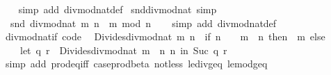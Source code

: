 \begin{isabellebody}
%
\isadelimproof
\ \ %
\endisadelimproof
%
\isatagproof
{}\isamarkupfalse%
\ {\isacharparenleft}{\kern0pt}simp\ add{\isacharcolon}{\kern0pt}\ divmod{\isacharunderscore}{\kern0pt}nat{\isacharunderscore}{\kern0pt}def{\isacharparenright}{\kern0pt}%
\endisatagproof
{\isafoldproof}%
%
\isadelimproof
\isanewline
%
\endisadelimproof
\isanewline
{}\isamarkupfalse%
\ snd{\isacharunderscore}{\kern0pt}divmod{\isacharunderscore}{\kern0pt}nat\ {\isacharbrackleft}{\kern0pt}simp{\isacharbrackright}{\kern0pt}{\isacharcolon}{\kern0pt}\isanewline
\ \ {\isachardoublequoteopen}snd\ {\isacharparenleft}{\kern0pt}divmod{\isacharunderscore}{\kern0pt}nat\ m\ n{\isacharparenright}{\kern0pt}\ {\isacharequal}{\kern0pt}\ m\ mod\ n{\isachardoublequoteclose}\isanewline
%
\isadelimproof
\ \ %
\endisadelimproof
%
\isatagproof
{}\isamarkupfalse%
\ {\isacharparenleft}{\kern0pt}simp\ add{\isacharcolon}{\kern0pt}\ divmod{\isacharunderscore}{\kern0pt}nat{\isacharunderscore}{\kern0pt}def{\isacharparenright}{\kern0pt}%
\endisatagproof
{\isafoldproof}%
%
\isadelimproof
\isanewline
%
\endisadelimproof
\isanewline
{}\isamarkupfalse%
\ divmod{\isacharunderscore}{\kern0pt}nat{\isacharunderscore}{\kern0pt}if\ {\isacharbrackleft}{\kern0pt}code{\isacharbrackright}{\kern0pt}{\isacharcolon}{\kern0pt}\isanewline
\ \ {\isachardoublequoteopen}Divides{\isachardot}{\kern0pt}divmod{\isacharunderscore}{\kern0pt}nat\ m\ n\ {\isacharequal}{\kern0pt}\ {\isacharparenleft}{\kern0pt}if\ n\ {\isacharequal}{\kern0pt}\ {}\ {\isasymor}\ m\ {\isacharless}{\kern0pt}\ n\ then\ {\isacharparenleft}{\kern0pt}{}{\isacharcomma}{\kern0pt}\ m{\isacharparenright}{\kern0pt}\ else\isanewline
\ \ \ \ let\ {\isacharparenleft}{\kern0pt}q{\isacharcomma}{\kern0pt}\ r{\isacharparenright}{\kern0pt}\ {\isacharequal}{\kern0pt}\ Divides{\isachardot}{\kern0pt}divmod{\isacharunderscore}{\kern0pt}nat\ {\isacharparenleft}{\kern0pt}m\ {\isacharminus}{\kern0pt}\ n{\isacharparenright}{\kern0pt}\ n\ in\ {\isacharparenleft}{\kern0pt}Suc\ q{\isacharcomma}{\kern0pt}\ r{\isacharparenright}{\kern0pt}{\isacharparenright}{\kern0pt}{\isachardoublequoteclose}\isanewline
%
\isadelimproof
\ \ %
\endisadelimproof
%
\isatagproof
{}\isamarkupfalse%
\ {\isacharparenleft}{\kern0pt}simp\ add{\isacharcolon}{\kern0pt}\ prod{\isacharunderscore}{\kern0pt}eq{\isacharunderscore}{\kern0pt}iff\ case{\isacharunderscore}{\kern0pt}prod{\isacharunderscore}{\kern0pt}beta\ not{\isacharunderscore}{\kern0pt}less\ le{\isacharunderscore}{\kern0pt}div{\isacharunderscore}{\kern0pt}geq\ le{\isacharunderscore}{\kern0pt}mod{\isacharunderscore}{\kern0pt}geq{\isacharparenright}{\kern0pt}%

\end{isabellebody}
